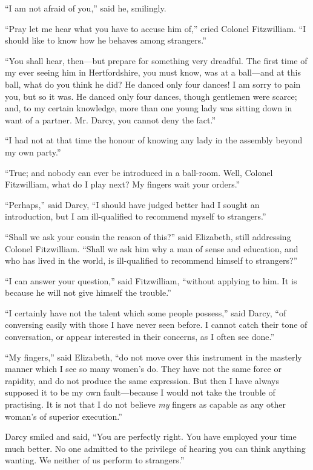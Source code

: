 ``I am not afraid of you,'' said he, smilingly.

``Pray let me hear what you have to accuse him of,'' cried Colonel Fitzwilliam. ``I should like to know how he behaves among strangers.''

``You shall hear, then---but prepare for something very dreadful. The first time of my ever seeing him in Hertfordshire, you must know, was at a ball---and at this ball, what do you think he did? He danced only four dances! I am sorry to pain you, but so it was. He danced only four dances, though gentlemen were scarce; and, to my certain knowledge, more than one young lady was sitting down in want of a partner. Mr. Darcy, you cannot deny the fact.''

``I had not at that time the honour of knowing any lady in the assembly beyond my own party.''

``True; and nobody can ever be introduced in a ball-room. Well, Colonel Fitzwilliam, what do I play next? My fingers wait your orders.''

``Perhaps,'' said Darcy, ``I should have judged better had I sought an introduction, but I am ill-qualified to recommend myself to strangers.''

``Shall we ask your cousin the reason of this?'' said Elizabeth, still addressing Colonel Fitzwilliam. ``Shall we ask him why a man of sense and education, and who has lived in the world, is ill-qualified to recommend himself to strangers?''

``I can answer your question,'' said Fitzwilliam, ``without applying to him. It is because he will not give himself the trouble.''

``I certainly have not the talent which some people possess,'' said Darcy, ``of conversing easily with those I have never seen before. I cannot catch their tone of conversation, or appear interested in their concerns, as I often see done.''

``My fingers,'' said Elizabeth, ``do not move over this instrument in the masterly manner which I see so many women's do. They have not the same force or rapidity, and do not produce the same expression. But then I have always supposed it to be my own fault---because I would not take the trouble of practising. It is not that I do not believe \textit{my} fingers as capable as any other woman's of superior execution.''

Darcy smiled and said, ``You are perfectly right. You have employed your time much better. No one admitted to the privilege of hearing you can think anything wanting. We neither of us perform to strangers.''

